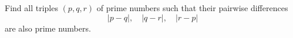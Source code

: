 Find all triples $(p,q,r)$ of prime numbers such that their pairwise differences
$$|p-q|,\quad |q-r|,\quad |r-p|$$
are also prime numbers.